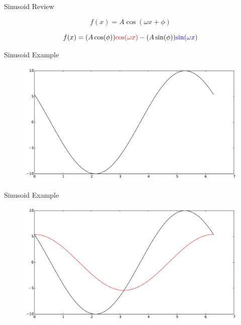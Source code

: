 \documentclass{beamer}
\begin{document}
\begin{frame}{Sinusoid Review}

\[ f(x) = A \cos( \omega x + \phi) \]

\[ f(x) = (A\cos(\phi))\textcolor{red}{\cos(\omega x)} - (A\sin(\phi))\textcolor{blue}{\sin(\omega x)} \]



\end{frame}

\begin{frame}{Sinusoid Example}

\begin{figure}[t]
    \includegraphics[width=\textwidth]{SineDecomp1.pdf}
\end{figure}

\end{frame}

\begin{frame}{Sinusoid Example}

\begin{figure}[t]
    \includegraphics[width=\textwidth]{SineDecomp2.pdf}
\end{figure}

\end{frame}
\end{document}
